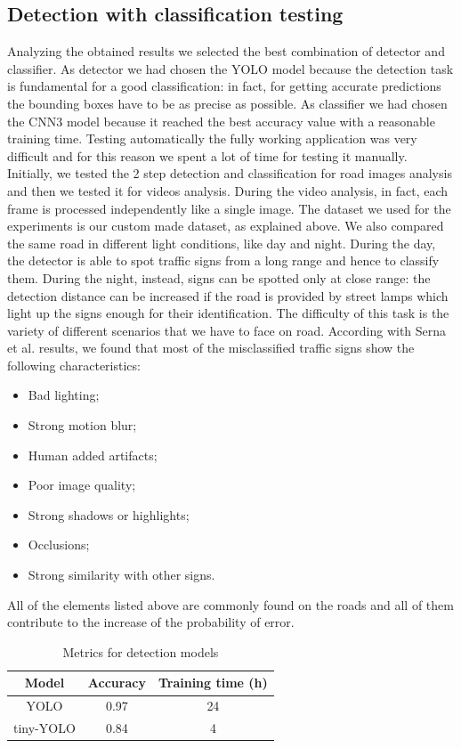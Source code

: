 \documentclass[10pt,twocolumn,letterpaper]{article}
\begin{document}
\subsection{Detection with classification testing}
Analyzing the obtained results we selected the best combination of detector and classifier. As detector we had chosen the YOLO model because the detection task is fundamental for a good classification: in fact, for getting accurate predictions the bounding boxes have to be as precise as possible. As classifier we had chosen the CNN3 model because it reached the best accuracy value with a reasonable training time. Testing automatically the fully working application was very difficult and for this reason we spent a lot of time for testing it manually. Initially, we tested the 2 step detection and classification for road images analysis and then we tested it for videos analysis. During the video analysis, in fact, each frame is processed independently like a single image. The dataset we used for the experiments is our custom made dataset, as explained above. We also compared the same road in different light conditions, like day and night. During the day, the detector is able to spot traffic signs from a long range and hence to classify them. During the night, instead, signs can be spotted only at close range: the detection distance can be increased if the road is provided by street lamps which light up the signs enough for their identification. 
The difficulty of this task is the variety of different scenarios that we have to face on road. According with Serna et al. \cite{gamezPaper} results, we found that most of the misclassified traffic signs show the following characteristics:
\begin{itemize}[noitemsep,topsep=0pt]
	\item Bad lighting;
	\item Strong motion blur;
	\item Human added artifacts;
	\item Poor image quality;
	\item Strong shadows or highlights;
	\item Occlusions;
	\item Strong similarity with other signs.
\end{itemize} 
All of the elements listed above are commonly found on the roads and all of them contribute to the increase of the probability of error.

\begin{table}[h!]
	\begin{center}
		\begin{tabular}{|c|c|c|}
			\hline
			Model & Accuracy & Training time (h) \\
			\hline\hline
			YOLO & 0.97 & 24 \\
			tiny-YOLO & 0.84 & 4 \\
			\hline
		\end{tabular}
	\end{center}
	\caption{Metrics for detection models}
	\label{yolo-metrics}
\end{table}
\end{document}
